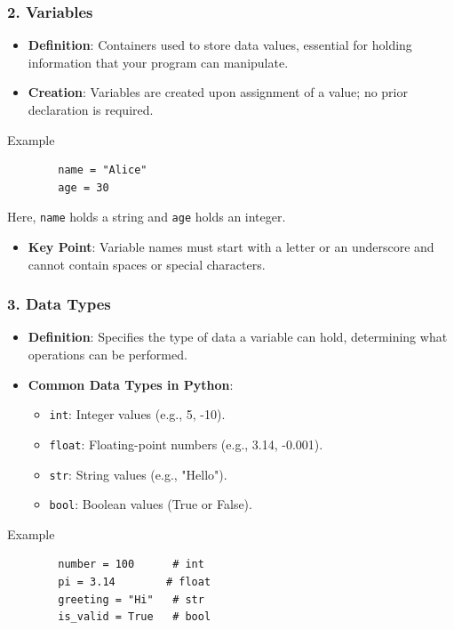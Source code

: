 \documentclass{beamer}
\begin{document}
\begin{frame}
    \frametitle{2. Variables}
    \begin{itemize}
        \item \textbf{Definition}: Containers used to store data values, essential for holding information that your program can manipulate.
        \item \textbf{Creation}: Variables are created upon assignment of a value; no prior declaration is required.
    \end{itemize}
    \begin{block}{Example}
        \begin{lstlisting}
        name = "Alice"
        age = 30
        \end{lstlisting}
        Here, \texttt{name} holds a string and \texttt{age} holds an integer.
    \end{block}
    \begin{itemize}
        \item \textbf{Key Point}: Variable names must start with a letter or an underscore and cannot contain spaces or special characters.
    \end{itemize}
\end{frame}

\begin{frame}
    \frametitle{3. Data Types}
    \begin{itemize}
        \item \textbf{Definition}: Specifies the type of data a variable can hold, determining what operations can be performed.
        \item \textbf{Common Data Types in Python}:
        \begin{itemize}
            \item \texttt{int}: Integer values (e.g., 5, -10).
            \item \texttt{float}: Floating-point numbers (e.g., 3.14, -0.001).
            \item \texttt{str}: String values (e.g., "Hello").
            \item \texttt{bool}: Boolean values (True or False).
        \end{itemize}
    \end{itemize}
    \begin{block}{Example}
        \begin{lstlisting}
        number = 100      # int
        pi = 3.14        # float
        greeting = "Hi"   # str
        is_valid = True   # bool
        \end{lstlisting}
    \end{block}
\end{frame}
\end{document}
